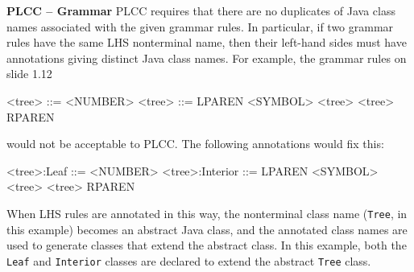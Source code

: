 \begin{minipage}[t]{\sw}
\slidenumber
\LARGE
{\bf PLCC -- Grammar}\exx
PLCC requires that there are no duplicates
of Java class names associated with the given grammar rules.
In particular, if two grammar rules have the same LHS nonterminal name,
then their left-hand sides must have annotations
giving distinct Java class names.
For example, the grammar rules on slide 1.12
\begin{qv}
<tree> ::= <NUMBER>
<tree> ::= LPAREN <SYMBOL> <tree> <tree> RPAREN
\end{qv}
would not be acceptable to PLCC.
The following annotations would fix this:
\begin{qv}
<tree>:Leaf     ::= <NUMBER>
<tree>:Interior ::= LPAREN <SYMBOL> <tree> <tree> RPAREN
\end{qv}
When LHS rules are annotated in this way,
the nonterminal class name (\verb'Tree', in this example)
becomes an abstract Java class,
and the annotated class names are used
to generate classes that extend the abstract class.
In this example,
both the \verb'Leaf' and \verb'Interior' classes
are declared to extend the abstract \verb'Tree' class.
\end{minipage}
\clearpage
